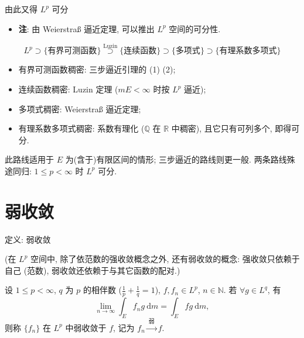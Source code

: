 \begin{frame}{由此又得 $L^p$ 可分}

\begin{itemize}
\item \textbf{注}: 由 Weierstra\ss{} 逼近定理, 可以推出 $L^p$ 空间的可分性.
\end{itemize}

\[
L^p \supset \{ \text{有界可测函数} \}
\overset{\text{Luzin}}{\supset} \{ \text{连续函数} \}
\supset \{ \text{多项式} \}
\supset \{ \text{有理系数多项式} \}
\]
\vspace{-0.5em}
\begin{itemize}
\item 有界可测函数稠密: 三步逼近引理的 (1) (2);
\item 连续函数稠密: Luzin 定理 ($mE < \infty$ 时按 $L^p$ 逼近);
\item 多项式稠密: Weierstra\ss{} 逼近定理;
\item 有理系数多项式稠密: 系数有理化 ($\mathbb{Q}$ 在 $\mathbb{R}$ 中稠密),
  且它只有\alert{可列}多个, 即得可分.
\end{itemize}

\pause

\begin{remark}
此路线适用于 $E$ 为(含于)有限区间的情形; 三步逼近的路线则更一般.
两条路线殊途同归: $1 \leqslant p < \infty$ 时 $L^p$ 可分.
\end{remark}

\end{frame}


\section[弱收敛]{弱收敛}


\begin{frame}{定义: 弱收敛}

(在 $L^p$ 空间中, 除了依\alert{范数}的强收敛概念之外, 还有\alert{弱收敛}的概念:
强收敛只依赖于自己 (范数), 弱收敛还依赖于与其它函数的配对.)

\pause

\begin{Def}[弱收敛]
设 $1 \leqslant p < \infty$, $q$ 为 $p$ 的\alert{相伴数}
($\frac{1}{p} + \frac{1}{q} = 1$), $f, f_n \in L^p$, $n \in \mathbb{N}$.
若 $\forall g \in L^q$, 有
\[
\lim_{n \to \infty} \int_E f_n g ~ \mathrm{d} m = \int_E f g ~ \mathrm{d} m ,
\]
则称 $\{ f_n \}$ 在 $L^p$ 中\alert{弱收敛}于 $f$,
记为 $f_n \xrightarrow{\ \text{弱}\ } f$.
\end{Def}

\end{frame}

